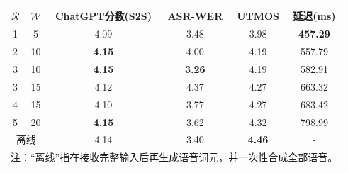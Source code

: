 \begin{table}[!htbp]
    \label{tab:llamaomni2_readwrite}
    \centering
    \small
    \begin{tabular}{cccccc}
        \toprule
        $\mathcal{R}$ & $\mathcal{W}$ & \textbf{ChatGPT分数(S2S)} & \textbf{ASR-WER} & \textbf{UTMOS} & \textbf{延迟(ms)} \\
        \midrule
        1 & 5 & 4.09 & 3.48 & 3.98 & \textbf{457.29} \\
        2 & 10 & \textbf{4.15} & 4.00 & 4.19 & 557.79 \\
        3 & 10 & \textbf{4.15} & \textbf{3.26} & 4.19 & 582.91 \\
        3 & 15 & 4.12 & 4.37 & 4.27 & 663.32 \\
        4 & 15 & 4.10 & 3.77 & 4.27 & 683.42 \\
        5 & 20 & \textbf{4.15} & 3.62 & 4.32 & 798.99 \\
        \multicolumn{2}{c}{离线} & 4.14 & 3.40 & \textbf{4.46} & - \\
        \bottomrule
        \multicolumn{6}{l}{\scriptsize 注：``离线''指在接收完整输入后再生成语音词元，并一次性合成全部语音。}
    \end{tabular}
\end{table}
